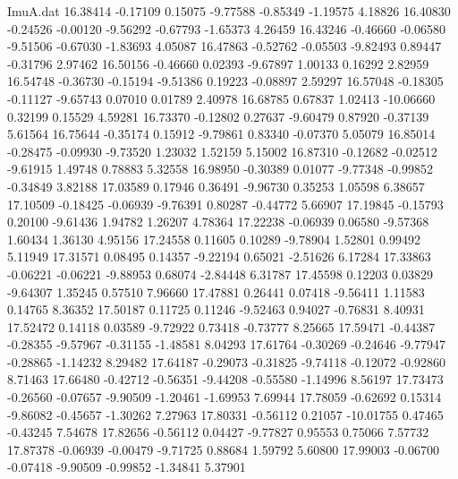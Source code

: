 \begin{filecontents}{ImuA.dat}
  16.38414   -0.17109    0.15075   -9.77588   -0.85349   -1.19575    4.18826
  16.40830   -0.24526   -0.00120   -9.56292   -0.67793   -1.65373    4.26459
  16.43246   -0.46660   -0.06580   -9.51506   -0.67030   -1.83693    4.05087
  16.47863   -0.52762   -0.05503   -9.82493    0.89447   -0.31796    2.97462
  16.50156   -0.46660    0.02393   -9.67897    1.00133    0.16292    2.82959
  16.54748   -0.36730   -0.15194   -9.51386    0.19223   -0.08897    2.59297
  16.57048   -0.18305   -0.11127   -9.65743    0.07010    0.01789    2.40978
  16.68785    0.67837    1.02413  -10.06660    0.32199    0.15529    4.59281
  16.73370   -0.12802    0.27637   -9.60479    0.87920   -0.37139    5.61564
  16.75644   -0.35174    0.15912   -9.79861    0.83340   -0.07370    5.05079
  16.85014   -0.28475   -0.09930   -9.73520    1.23032    1.52159    5.15002
  16.87310   -0.12682   -0.02512   -9.61915    1.49748    0.78883    5.32558
  16.98950   -0.30389    0.01077   -9.77348   -0.99852   -0.34849    3.82188
  17.03589    0.17946    0.36491   -9.96730    0.35253    1.05598    6.38657
  17.10509   -0.18425   -0.06939   -9.76391    0.80287   -0.44772    5.66907
  17.19845   -0.15793    0.20100   -9.61436    1.94782    1.26207    4.78364
  17.22238   -0.06939    0.06580   -9.57368    1.60434    1.36130    4.95156
  17.24558    0.11605    0.10289   -9.78904    1.52801    0.99492    5.11949
  17.31571    0.08495    0.14357   -9.22194    0.65021   -2.51626    6.17284
  17.33863   -0.06221   -0.06221   -9.88953    0.68074   -2.84448    6.31787
  17.45598    0.12203    0.03829   -9.64307    1.35245    0.57510    7.96660
  17.47881    0.26441    0.07418   -9.56411    1.11583    0.14765    8.36352
  17.50187    0.11725    0.11246   -9.52463    0.94027   -0.76831    8.40931
  17.52472    0.14118    0.03589   -9.72922    0.73418   -0.73777    8.25665
  17.59471   -0.44387   -0.28355   -9.57967   -0.31155   -1.48581    8.04293
  17.61764   -0.30269   -0.24646   -9.77947   -0.28865   -1.14232    8.29482
  17.64187   -0.29073   -0.31825   -9.74118   -0.12072   -0.92860    8.71463
  17.66480   -0.42712   -0.56351   -9.44208   -0.55580   -1.14996    8.56197
  17.73473   -0.26560   -0.07657   -9.90509   -1.20461   -1.69953    7.69944
  17.78059   -0.62692    0.15314   -9.86082   -0.45657   -1.30262    7.27963
  17.80331   -0.56112    0.21057  -10.01755    0.47465   -0.43245    7.54678
  17.82656   -0.56112    0.04427   -9.77827    0.95553    0.75066    7.57732
  17.87378   -0.06939   -0.00479   -9.71725    0.88684    1.59792    5.60800
  17.99003   -0.06700   -0.07418   -9.90509   -0.99852   -1.34841    5.37901

\end{filecontents}
